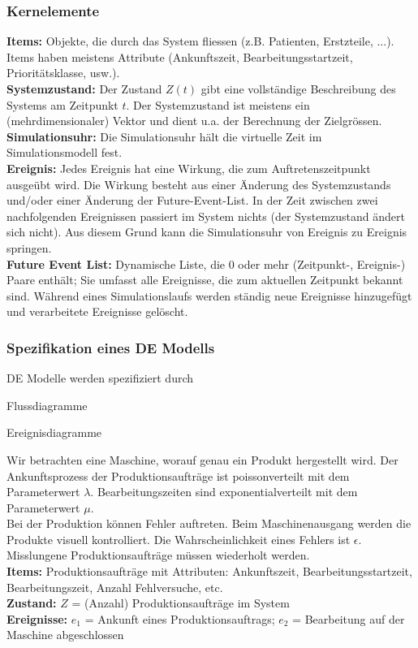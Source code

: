 \subsubsection{Kernelemente}
\textbf{Items:} Objekte, die durch das System fliessen (z.B. Patienten, Erstzteile, ...). Items haben meistens Attribute (Ankunftszeit, Bearbeitungsstartzeit, Prioritätsklasse, usw.). \\
\textbf{Systemzustand:} Der Zustand $Z(t)$ gibt eine vollständige Beschreibung des Systems am Zeitpunkt $t$. Der Systemzustand ist meistens ein (mehrdimensionaler) Vektor und dient u.a. der Berechnung der Zielgrössen. \\
\textbf{Simulationsuhr:} Die Simulationsuhr hält die virtuelle Zeit im Simulationsmodell fest. \\
\textbf{Ereignis:} Jedes Ereignis hat eine Wirkung, die zum Auftretenszeitpunkt ausgeübt wird. Die Wirkung besteht aus einer Änderung des Systemzustands und/oder einer Änderung der Future-Event-List. In der Zeit zwischen zwei nachfolgenden Ereignissen passiert im System nichts (der Systemzustand ändert sich nicht). Aus diesem Grund kann die Simulationsuhr von Ereignis zu Ereignis springen. \\
\textbf{Future Event List:} Dynamische Liste, die 0 oder mehr (Zeitpunkt-, Ereignis-) Paare enthält; Sie umfasst alle Ereignisse, die zum aktuellen Zeitpunkt bekannt sind. Während eines Simulationslaufs werden ständig neue Ereignisse hinzugefügt und verarbeitete Ereignisse gelöscht.

\subsubsection{Spezifikation eines DE Modells}
DE Modelle werden spezifiziert durch
\begin{compactenum}
	\item Flussdiagramme
	\item Ereignisdiagramme
\end{compactenum}

\begin{example}
	Wir betrachten eine Maschine, worauf genau ein Produkt hergestellt wird. Der Ankunftsprozess der Produktionsaufträge ist poissonverteilt mit dem Parameterwert $\lambda$. Bearbeitungszeiten sind exponentialverteilt mit dem Parameterwert $\mu$.\\
	Bei der Produktion können Fehler auftreten. Beim Maschinenausgang werden die Produkte visuell kontrolliert. Die Wahrscheinlichkeit eines Fehlers ist $\epsilon$. Misslungene Produktionsaufträge müssen wiederholt werden. \\
	\textbf{Items:} Produktionsaufträge mit Attributen: Ankunftszeit, Bearbeitungsstartzeit, Bearbeitungszeit, Anzahl Fehlversuche, etc. \\
	\textbf{Zustand:} $Z$ = (Anzahl) Produktionsaufträge im System \\
	\textbf{Ereignisse:} $e_1$ = Ankunft eines Produktionsauftrags; $e_2$ = Bearbeitung auf der Maschine abgeschlossen
\end{example}


